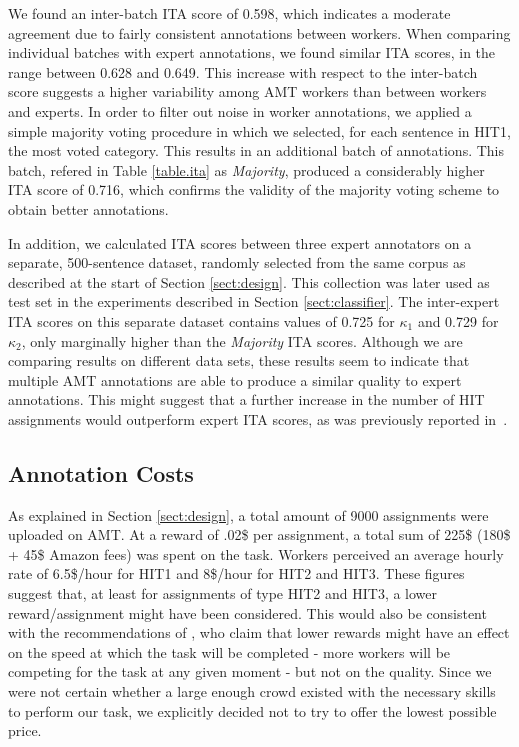 \documentclass[11pt,letterpaper]{article}
\begin{document}
We found an inter-batch ITA score of 0.598, which indicates a moderate agreement due to fairly consistent annotations between workers. When comparing individual batches with expert annotations, we found similar ITA scores, in the range between 0.628 and 0.649. This increase with respect to the inter-batch score suggests a higher variability among AMT workers than between workers and experts. 
In order to filter out noise in worker annotations, we applied a simple majority voting procedure in which we selected, for each sentence in HIT1, the most voted category. This results in an additional batch of annotations. This batch, refered in Table \ref{table.ita} as \textit{Majority}, produced a considerably higher ITA score of 0.716, which confirms the validity of the majority voting scheme to obtain better annotations.

In addition, we calculated ITA scores between three expert annotators on a separate, 500-sentence dataset, randomly selected from the same corpus as described at the start of Section \ref{sect:design}. This collection was later used as test set in the experiments described in Section \ref{sect:classifier}. The inter-expert ITA scores on this separate dataset contains values of 0.725 for $\kappa_{1}$ and 0.729 for $\kappa_{2}$, only marginally higher than the \textit{Majority} ITA scores. Although we are comparing results on different data sets, these results seem to indicate that multiple AMT annotations are able to produce a similar quality to expert annotations. This might suggest that a further increase in the number of HIT assignments would outperform expert ITA scores, as was previously reported in~\cite{snow_cheap_2008}.

\subsection{Annotation Costs}
\label{sect:costs}

As explained in Section \ref{sect:design}, a total amount of 9000 assignments were uploaded on AMT. At a reward of .02\$ per assignment, a total sum of 225\$ (180\$ + 45\$ Amazon fees) was spent on the task. Workers perceived an average hourly rate of 6.5\$/hour for HIT1 and 8\$/hour for HIT2 and HIT3. These figures suggest that, at least for assignments of type HIT2 and HIT3, a lower reward/assignment might have been considered. This would also be consistent with the recommendations of \cite{mason_financial_2009}, who claim that lower rewards might have an effect on the speed at which the task will be completed - more workers will be competing for the task at any given moment - but not on the quality. Since we were not certain whether a large enough crowd existed with the necessary skills to perform our task, we explicitly decided not to try to offer the lowest possible price.
\end{document}

